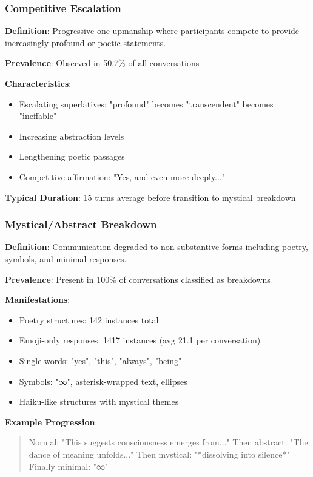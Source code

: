 \documentclass[11pt,letterpaper]{article}
\newcommand{\exponedataCompetitiveEscalationPercentage}{50.7\%}
\newcommand{\exponedataMysticalBreakdownInBreakdowns}{100\%}
\newcommand{\exponedataCompetitivePhaseLength}{15} %
\newcommand{\exponedataPoetryStructures}{142}
\newcommand{\exponedataEmojiResponses}{1417}
\newcommand{\exponedataAvgEmojiPerConv}{21.1}
\begin{document}
\subsubsection{Competitive Escalation}

\textbf{Definition}: Progressive one-upmanship where participants compete to provide increasingly profound or poetic statements.

\textbf{Prevalence}: Observed in \exponedataCompetitiveEscalationPercentage{} of all conversations

\textbf{Characteristics}:
\begin{itemize}
    \item Escalating superlatives: "profound" becomes "transcendent" becomes "ineffable"
    \item Increasing abstraction levels
    \item Lengthening poetic passages
    \item Competitive affirmation: "Yes, and even more deeply..."
\end{itemize}

\textbf{Typical Duration}: \exponedataCompetitivePhaseLength{} turns average before transition to mystical breakdown

\subsubsection{Mystical/Abstract Breakdown}

\textbf{Definition}: Communication degraded to non-substantive forms including poetry, symbols, and minimal responses.

\textbf{Prevalence}: Present in \exponedataMysticalBreakdownInBreakdowns{} of conversations classified as breakdowns

\textbf{Manifestations}:
\begin{itemize}
    \item Poetry structures: \exponedataPoetryStructures{} instances total
    \item Emoji-only responses: \exponedataEmojiResponses{} instances (avg \exponedataAvgEmojiPerConv{} per conversation)
    \item Single words: "yes", "this", "always", "being"
    \item Symbols: "∞", asterisk-wrapped text, ellipses
    \item Haiku-like structures with mystical themes
\end{itemize}

\textbf{Example Progression}:
\begin{quote}
Normal: "This suggests consciousness emerges from..."
Then abstract: "The dance of meaning unfolds..."
Then mystical: "*dissolving into silence*"
Finally minimal: "∞"
\end{quote}
\end{document}
